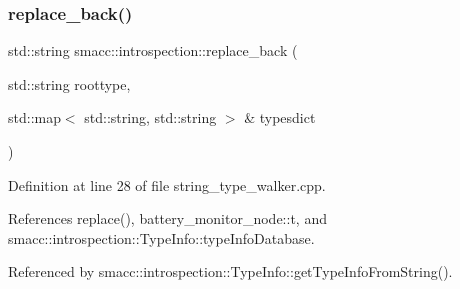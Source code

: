 \subsubsection{\texorpdfstring{replace\+\_\+back()}{replace\_back()}}
{\footnotesize\ttfamily std\+::string smacc\+::introspection\+::replace\+\_\+back (\begin{DoxyParamCaption}\item[{std\+::string}]{roottype,  }\item[{std\+::map$<$ std\+::string, std\+::string $>$ \&}]{typesdict }\end{DoxyParamCaption})}



Definition at line 28 of file string\+\_\+type\+\_\+walker.\+cpp.



References replace(), battery\+\_\+monitor\+\_\+node\+::t, and smacc\+::introspection\+::\+Type\+Info\+::type\+Info\+Database.



Referenced by smacc\+::introspection\+::\+Type\+Info\+::get\+Type\+Info\+From\+String().


